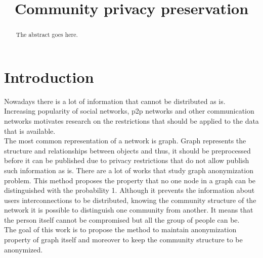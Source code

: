 \documentclass[conference]{IEEEtran}
\begin{document}
\title{Community privacy preservation}

\author{
\and
{}
\and
{}
}

\maketitle


\begin{abstract}
	The abstract goes here.
\end{abstract}

\IEEEpeerreviewmaketitle

\section{Introduction}
	Nowadays there is a lot of information that cannot be distributed as is. Increasing popularity of social networks, p2p networks and other communication networks motivates research on the restrictions that should be applied to the data that is available.\\
	The most common representation of a network is graph. Graph represents the structure and relationships between objects and thus, it should be preprocessed before it can be published due to privacy restrictions that do not allow publish such information as is. There are a lot of works that study graph anonymization problem. This method proposes the property that no one node in a graph can be distinguished with the probability 1. Although it prevents the information about users interconnections to be distributed, knowing the community structure of the network it is possible to distinguish one community from another. It means that the person itself cannot be compromised but all the group of people can be.\\
	The goal of this work is to propose the method to maintain anonymization property of graph itself and moreover to keep the community structure to be anonymized.
\end{document}
